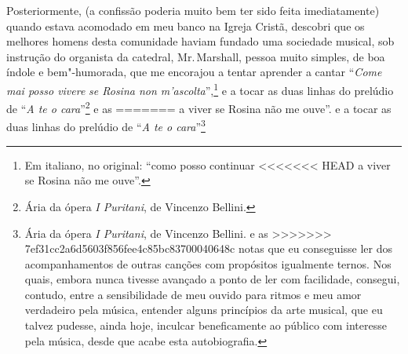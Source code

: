 {{{{{{{{{{{{{{{{{{{{{{{{{{{{{{{{{{{{{{{{{{{{{{{{{{{{{{{{{{{{{{{{{{{{{{{{{{{{{{{%
Posteriormente, (a confissão poderia muito bem ter sido feita
imediatamente) quando estava acomodado em meu banco na Igreja Cristã,
descobri que os melhores homens desta comunidade haviam fundado uma
sociedade musical, sob instrução do organista da catedral, Mr.\,Marshall,
pessoa muito simples, de boa índole e bem"-humorada, que me encorajou a
tentar aprender a cantar ``\textit{Come mai posso vivere} \textit{se Rosina
non m'ascolta}'',\footnote{Em italiano, no original: ``como posso continuar
<<<<<<< HEAD
  a viver se Rosina não me ouve''.} e a tocar as duas
linhas do prelúdio de ``\textit{A te o cara}''\footnote{Ária da ópera
  \textit{I Puritani}, de Vincenzo Bellini.} e as
=======
  a viver se Rosina não me ouve''.  e a tocar as duas
linhas do prelúdio de ``\textit{A te o cara}''\footnote{Ária da ópera
  \textit{I Puritani}, de Vincenzo Bellini.  e as
>>>>>>> 7ef31cc2a6d5603f856fee4c85bc83700040648c
notas que eu conseguisse ler dos acompanhamentos de outras canções com
propósitos igualmente ternos. Nos quais, embora nunca tivesse avançado a
ponto de ler com facilidade, consegui, contudo, entre a sensibilidade de
meu ouvido para ritmos e meu amor verdadeiro pela música, entender
alguns princípios da arte musical, que eu talvez pudesse, ainda hoje,
inculcar beneficamente ao público com interesse pela música, desde que
acabe esta autobiografia.

}}}}}}}}}}}}}}}}}}}}}}}}}}}}}}}}}}}}}}}}}}}}}}}}}}}}}}}}}}}}}}}}}}}}}}}}}}}}}}}}
